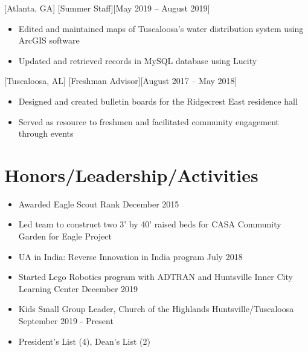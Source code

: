 \documentclass[hidelinks, 11pt]{article}
\begin{document}
		[Atlanta, GA]
		[Summer Staff][May 2019 – August 2019]
		
			\begin{itemize}
				\item Edited and maintained maps of Tuscaloosa’s water distribution system using ArcGIS software
				\item Updated and retrieved records in MySQL database using Lucity
			\end{itemize}\leavevmode
		
		[Tuscaloosa, AL]
		[Freshman Advisor][August 2017 – May 2018]
		
			\begin{itemize}
				\item Designed and created bulletin boards for the Ridgecrest East residence hall
				\item Served as resource to freshmen and facilitated community engagement through events
			\end{itemize}\leavevmode
	
	\section{Honors/Leadership/Activities}
	
		\begin{itemize}
			\item Awarded Eagle Scout Rank \hfill December 2015
			\item Led team to construct two 3' by 40' raised beds for CASA Community Garden for Eagle Project
			\item UA in India: Reverse Innovation in India program \hfill July 2018
			\item Started Lego Robotics program with ADTRAN and Huntsville Inner City Learning Center \hfill December 2019
			\item Kids Small Group Leader, Church of the Highlands Huntsville/Tuscaloosa \hfill September 2019 - Present
			\item President's List (4), Dean's List (2)
		\end{itemize}
	 
\end{document}
